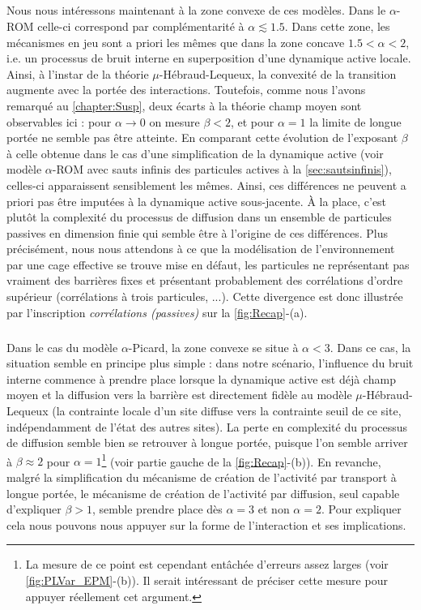 \subparagraph{}Nous nous intéressons maintenant à la zone convexe de ces modèles. Dans le $\alpha$-ROM celle-ci correspond par complémentarité à $\alpha\lesssim 1.5$. Dans cette zone, les mécanismes en jeu sont a priori les mêmes que dans la zone concave $1.5 < \alpha < 2$, i.e. un processus de bruit interne en superposition d'une dynamique active locale. Ainsi, à l'instar de la théorie $\mu$-Hébraud-Lequeux, la convexité de la transition augmente avec la portée des interactions. Toutefois, comme nous l'avons remarqué au \autoref{chapter:Susp}, deux écarts à la théorie champ moyen sont observables ici : pour $\alpha \rightarrow 0$ on mesure $\beta < 2$, et pour $\alpha = 1$ la limite de longue portée ne semble pas être atteinte. En comparant cette évolution de l'exposant $\beta$ à celle obtenue dans le cas d'une simplification de la dynamique active (voir modèle $\alpha$-ROM avec sauts infinis des particules actives à la \autoref{sec:sautsinfinis}), celles-ci apparaissent sensiblement les mêmes. Ainsi, ces différences ne peuvent a priori pas être imputées à la dynamique active sous-jacente. \`A la place, c'est plutôt la complexité du processus de diffusion dans un ensemble de particules passives en dimension finie qui semble être à l'origine de ces différences. Plus précisément, nous nous attendons à ce que la modélisation de l'environnement par une cage effective se trouve mise en défaut, les particules ne représentant pas vraiment des barrières fixes et présentant probablement des corrélations d'ordre supérieur (corrélations à trois particules, ...). Cette divergence est donc illustrée par l'inscription \textit{corrélations (passives)} sur la \autoref{fig:Recap}-(a).

\subparagraph{}Dans le cas du modèle $\alpha$-Picard, la zone convexe se situe à $\alpha < 3$. Dans ce cas, la situation semble en principe plus simple : dans notre scénario, l'influence du bruit interne commence à prendre place lorsque la dynamique active est déjà champ moyen et la diffusion vers la barrière est directement fidèle au modèle $\mu$-Hébraud-Lequeux (la contrainte locale d'un site diffuse vers la contrainte seuil de ce site, indépendamment de l'état des autres sites). La perte en complexité du processus de diffusion semble bien se retrouver à longue portée, puisque l'on semble arriver à $\beta \approx 2$ pour $\alpha = 1$\footnote{La mesure de ce point est cependant entâchée d'erreurs assez larges (voir \autoref{fig:PLVar_EPM}-(b)). Il serait intéressant de préciser cette mesure pour appuyer réellement cet argument.} (voir partie gauche de la \autoref{fig:Recap}-(b)). En revanche, malgré la simplification du mécanisme de création de l'activité par transport à longue portée, le mécanisme de création de l'activité par diffusion, seul capable d'expliquer $\beta >1$, semble prendre place dès $\alpha=3$ et non $\alpha = 2$. Pour expliquer cela nous pouvons nous appuyer sur la forme de l'interaction et ses implications.

